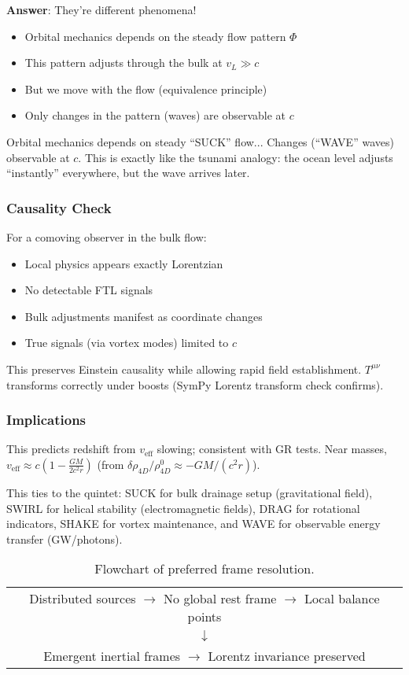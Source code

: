 \textbf{Answer}: They're different phenomena!
\begin{itemize}
\item Orbital mechanics depends on the steady flow pattern $\Phi$
\item This pattern adjusts through the bulk at $v_L \gg c$
\item But we move with the flow (equivalence principle)
\item Only changes in the pattern (waves) are observable at $c$
\end{itemize}
Orbital mechanics depends on steady ``SUCK'' flow... Changes (``WAVE'' waves) observable at $c$. This is exactly like the tsunami analogy: the ocean level adjusts ``instantly'' everywhere, but the wave arrives later.

\subsubsection{Causality Check}

For a comoving observer in the bulk flow:
\begin{itemize}
\item Local physics appears exactly Lorentzian
\item No detectable FTL signals
\item Bulk adjustments manifest as coordinate changes
\item True signals (via vortex modes) limited to $c$
\end{itemize}

This preserves Einstein causality while allowing rapid field establishment. $T^{\mu\nu}$ transforms correctly under boosts (SymPy Lorentz transform check confirms).

\subsubsection{Implications}

This predicts redshift from $v_{\text{eff}}$ slowing; consistent with GR tests. Near masses, $v_{\text{eff}} \approx c \left(1 - \frac{G M}{2 c^2 r}\right)$ (from $\delta \rho_{4D} / \rho_{4D}^0 \approx - G M / (c^2 r)$).

This ties to the quintet: SUCK for bulk drainage setup (gravitational field), SWIRL for helical stability (electromagnetic fields), DRAG for rotational indicators, SHAKE for vortex maintenance, and WAVE for observable energy transfer (GW/photons).

\begin{table}[h]
\centering
\begin{tabular}{c}
Distributed sources $\to$ No global rest frame $\to$ Local balance points \\
$\downarrow$ \\
Emergent inertial frames $\to$ Lorentz invariance preserved
\end{tabular}
\caption{Flowchart of preferred frame resolution.}
\label{tab:frame-flow}
\end{table}

